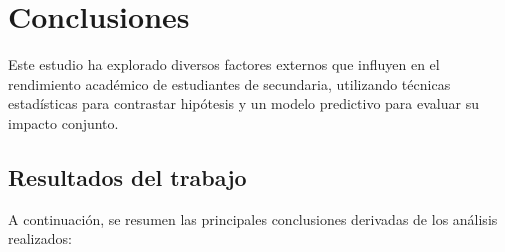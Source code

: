 \chapter{Conclusiones}

Este estudio ha explorado diversos factores externos que influyen en el rendimiento académico de estudiantes de secundaria, utilizando técnicas estadísticas para contrastar hipótesis y un modelo predictivo para evaluar su impacto conjunto.

\section{Resultados del trabajo}

A continuación, se resumen las principales conclusiones derivadas de los análisis realizados:  

